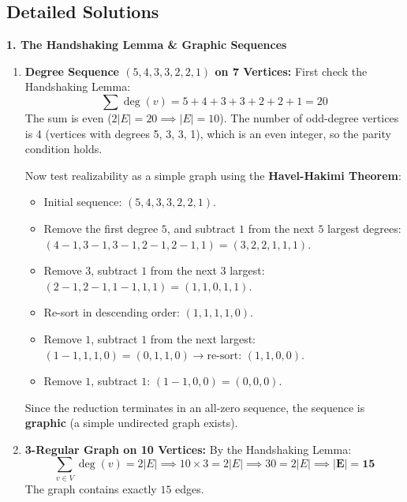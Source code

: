 \subsection*{Detailed Solutions}

\textbf{1. The Handshaking Lemma \& Graphic Sequences}
\begin{enumerate}
    \item \textbf{Degree Sequence $(5, 4, 3, 3, 2, 2, 1)$ on 7 Vertices:}
    First check the Handshaking Lemma:
    \begin{equation*}
    \sum \deg(v) = 5 + 4 + 3 + 3 + 2 + 2 + 1 = 20
    \end{equation*}
    The sum is even ($2|E| = 20 \implies |E| = 10$). The number of odd-degree vertices is 4 (vertices with degrees 5, 3, 3, 1), which is an even integer, so the parity condition holds.
    
    Now test realizability as a simple graph using the \textbf{Havel-Hakimi Theorem}:
    \begin{itemize}
        \item Initial sequence: $(5, 4, 3, 3, 2, 2, 1)$.
        \item Remove the first degree $5$, and subtract $1$ from the next $5$ largest degrees:
        $(4-1, 3-1, 3-1, 2-1, 2-1, 1) = (3, 2, 2, 1, 1, 1)$.
        \item Remove $3$, subtract $1$ from the next $3$ largest:
        $(2-1, 2-1, 1-1, 1, 1) = (1, 1, 0, 1, 1)$.
        \item Re-sort in descending order: $(1, 1, 1, 1, 0)$.
        \item Remove $1$, subtract $1$ from the next largest:
        $(1-1, 1, 1, 0) = (0, 1, 1, 0) \to \text{re-sort: } (1, 1, 0, 0)$.
        \item Remove $1$, subtract $1$:
        $(1-1, 0, 0) = (0, 0, 0)$.
    \end{itemize}
    Since the reduction terminates in an all-zero sequence, the sequence is \textbf{graphic} (a simple undirected graph exists).
    
    \item \textbf{3-Regular Graph on 10 Vertices:}
    By the Handshaking Lemma:
    \begin{equation*}
    \sum_{v \in V} \deg(v) = 2|E| \implies 10 \times 3 = 2|E| \implies 30 = 2|E| \implies \mathbf{|E| = 15}
    \end{equation*}
    The graph contains exactly $15$ edges.
\end{enumerate}

